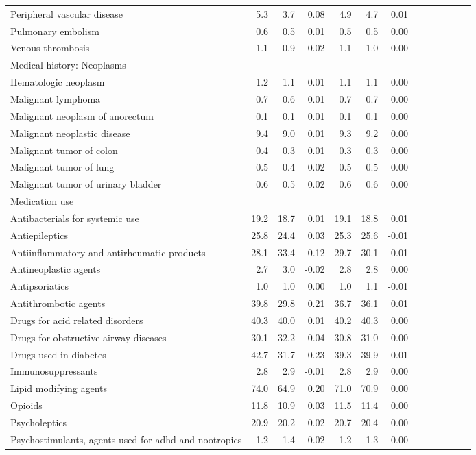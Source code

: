 \documentclass[11pt,]{article}
\begin{document}
\begin{longtable}{lrrrrrrrrrrrr}
      Peripheral vascular disease &  5.3 &  3.7 &  0.08 &  4.9 &  4.7 &  0.01 \\ 
      Pulmonary embolism &  0.6 &  0.5 &  0.01 &  0.5 &  0.5 &  0.00 \\ 
      Venous thrombosis &  1.1 &  0.9 &  0.02 &  1.1 &  1.0 &  0.00 \\ 
  Medical history: Neoplasms &    &    &     &    &    &     \\ 
      Hematologic neoplasm &  1.2 &  1.1 &  0.01 &  1.1 &  1.1 &  0.00 \\ 
      Malignant lymphoma &  0.7 &  0.6 &  0.01 &  0.7 &  0.7 &  0.00 \\ 
      Malignant neoplasm of anorectum &  0.1 &  0.1 &  0.01 &  0.1 &  0.1 &  0.00 \\ 
      Malignant neoplastic disease &  9.4 &  9.0 &  0.01 &  9.3 &  9.2 &  0.00 \\ 
      Malignant tumor of colon &  0.4 &  0.3 &  0.01 &  0.3 &  0.3 &  0.00 \\ 
      Malignant tumor of lung &  0.5 &  0.4 &  0.02 &  0.5 &  0.5 &  0.00 \\ 
      Malignant tumor of urinary bladder &  0.6 &  0.5 &  0.02 &  0.6 &  0.6 &  0.00 \\ 
  Medication use &    &    &     &    &    &     \\ 
      Antibacterials for systemic use & 19.2 & 18.7 &  0.01 & 19.1 & 18.8 &  0.01 \\ 
      Antiepileptics & 25.8 & 24.4 &  0.03 & 25.3 & 25.6 & -0.01 \\ 
      Antiinflammatory and antirheumatic products & 28.1 & 33.4 & -0.12 & 29.7 & 30.1 & -0.01 \\ 
      Antineoplastic agents &  2.7 &  3.0 & -0.02 &  2.8 &  2.8 &  0.00 \\ 
      Antipsoriatics &  1.0 &  1.0 &  0.00 &  1.0 &  1.1 & -0.01 \\ 
      Antithrombotic agents & 39.8 & 29.8 &  0.21 & 36.7 & 36.1 &  0.01 \\ 
      Drugs for acid related disorders & 40.3 & 40.0 &  0.01 & 40.2 & 40.3 &  0.00 \\ 
      Drugs for obstructive airway diseases & 30.1 & 32.2 & -0.04 & 30.8 & 31.0 &  0.00 \\ 
      Drugs used in diabetes & 42.7 & 31.7 &  0.23 & 39.3 & 39.9 & -0.01 \\ 
      Immunosuppressants &  2.8 &  2.9 & -0.01 &  2.8 &  2.9 &  0.00 \\ 
      Lipid modifying agents & 74.0 & 64.9 &  0.20 & 71.0 & 70.9 &  0.00 \\ 
      Opioids & 11.8 & 10.9 &  0.03 & 11.5 & 11.4 &  0.00 \\ 
      Psycholeptics & 20.9 & 20.2 &  0.02 & 20.7 & 20.4 &  0.00 \\ 
      Psychostimulants, agents used for adhd and nootropics &  1.2 &  1.4 & -0.02 &  1.2 &  1.3 &  0.00 \\ 
   \bottomrule\end{longtable}
\end{document}
